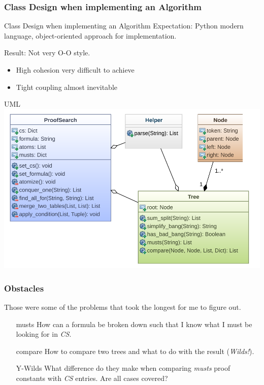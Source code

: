\documentclass{beamer}
\begin{document}
\subsubsection{Class Design when implementing an Algorithm}
\begin{frame}{Class Design when implementing an Algorithm}
	Expectation: Python modern language, object-oriented approach for implementation.
	
	Result: Not very O-O style.
	\begin{itemize}
		\item High cohesion very difficult to achieve
		\item Tight coupling almost inevitable
	\end{itemize}
\end{frame}

\begin{frame}{UML}
	\includegraphics[scale=0.5]{uml.pdf}
\end{frame}

\subsubsection{Obstacles}
\begin{frame}
	Those were some of the problems that took the longest for me to figure out.
	\begin{itemize}
		\item[musts] How can a formula be broken down such that I know what I must be looking for in \emph{CS}.
		\item[compare] How to compare two trees and what to do with the result (\emph{Wilds!}).
		\item[Y-Wilds] What difference do they make when comparing \emph{musts} proof constants with \emph{CS} entries. Are all cases covered?
	\end{itemize}
\end{frame}
\end{document}
